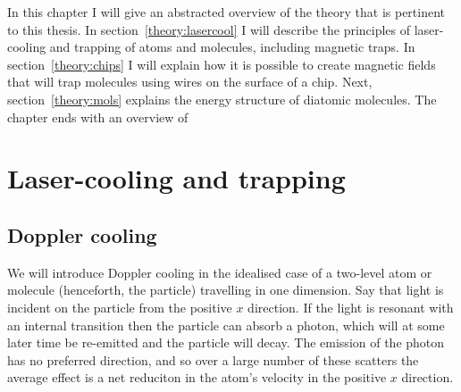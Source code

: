 In this chapter I will give an abstracted overview of the theory that is
pertinent to this thesis. In section~\ref{theory:lasercool} I will describe the
principles of laser-cooling and trapping of atoms and molecules, including
magnetic traps. In section~\ref{theory:chips} I will explain how it is possible
to create magnetic fields that will trap molecules using wires on the surface
of a chip. Next, section~\ref{theory:mols} explains the energy structure of
diatomic molecules. The chapter ends with an overview of 

\section{Laser-cooling and trapping}

\subsection{Doppler cooling}

We will introduce Doppler cooling in the idealised case of a two-level atom or
molecule (henceforth, the particle) travelling in one dimension.  Say that
light is incident on the particle from the positive $x$ direction. If the light
is resonant with an internal transition then the particle can absorb a photon,
which will at some later time be re-emitted and the particle will decay. The
emission of the photon has no preferred direction, and so over a large number
of these scatters the average effect is a net reduciton in the atom's velocity
in the positive $x$ direction.

